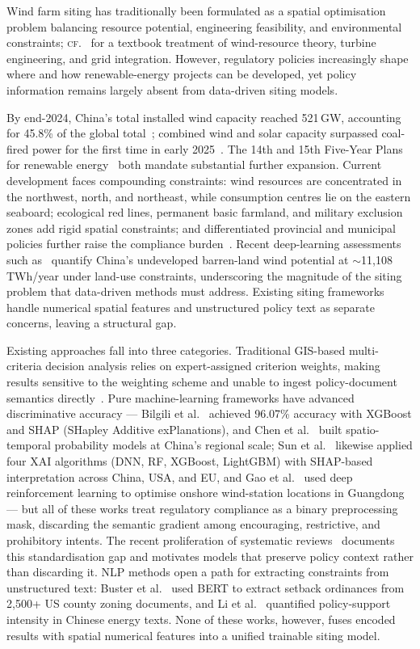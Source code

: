 \documentclass[12pt, a4paper]{article}
\begin{document}
Wind farm siting has traditionally been formulated as a
spatial optimisation problem balancing resource potential,
engineering feasibility, and environmental constraints;
\textsc{cf.~}\cite{manwell2010} for a textbook treatment of
wind-resource theory, turbine engineering, and grid
integration. However, regulatory policies increasingly shape
where and how renewable-energy projects can be developed, yet
policy information remains largely absent from data-driven
siting models.

By end-2024, China's total installed wind capacity reached
521\,GW, accounting for 45.8\% of the global
total~\cite{ruan2025,he2020}; combined wind and solar capacity
surpassed coal-fired power for the first time in early
2025~\cite{ruan2025}. The 14th and 15th Five-Year Plans for
renewable energy~\cite{ndrc2022,ndrc2026} both mandate
substantial further expansion. Current development faces
compounding constraints: wind resources are concentrated in
the northwest, north, and northeast, while consumption centres
lie on the eastern seaboard; ecological red lines, permanent
basic farmland, and military exclusion zones add rigid spatial
constraints; and differentiated provincial and municipal
policies further raise the compliance burden~\cite{zhong2022}.
Recent deep-learning assessments such as~\cite{gao2026dgclstm}
quantify China's undeveloped barren-land wind potential at
$\sim$11{,}108\,TWh/year under land-use constraints,
underscoring the magnitude of the siting problem that
data-driven methods must address.
Existing siting frameworks handle numerical spatial features
and unstructured policy text as separate concerns, leaving a
structural gap.

Existing approaches fall into three categories. Traditional
GIS-based multi-criteria decision analysis relies on
expert-assigned criterion weights, making results sensitive to
the weighting scheme and unable to ingest policy-document
semantics directly~\cite{xu2020,wu2022}. Pure machine-learning
frameworks have advanced discriminative accuracy --- Bilgili
et al.~\cite{bilgili2024xai} achieved 96.07\% accuracy with
XGBoost and SHAP (SHapley Additive exPlanations), and Chen
et al.~\cite{chen2026} built
spatio-temporal probability models at China's regional scale;
Sun et al.~\cite{sun2024land} likewise applied four XAI
algorithms (DNN, RF, XGBoost, LightGBM) with SHAP-based
interpretation across China, USA, and EU, and
Gao et al.~\cite{gao2025drl} used deep reinforcement learning
to optimise onshore wind-station locations in Guangdong ---
but all of these works treat regulatory compliance as a binary
preprocessing mask, discarding the semantic gradient among
encouraging, restrictive, and prohibitory intents. The recent
proliferation of systematic reviews~\cite{wimhurst2023heliyon,jurasz2025}
documents this standardisation gap and motivates models that
preserve policy context rather than discarding it. NLP methods
open a path for extracting constraints from unstructured text:
Buster et al.~\cite{buster2024} used BERT to extract setback
ordinances from 2,500+ US county zoning documents, and Li et
al.~\cite{li2023} quantified policy-support intensity in
Chinese energy texts. None of these works, however, fuses
encoded results with spatial numerical features into a unified
trainable siting model.
\end{document}
